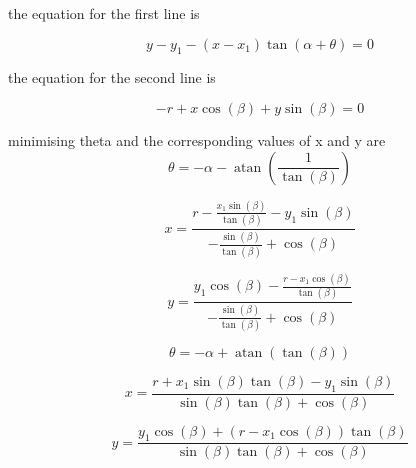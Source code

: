 \documentclass[12pt]{article}
\begin{document}
the equation for the first line is

$$y - y_{1} - \left(x - x_{1}\right) \tan{\left (\alpha + \theta \right )} = 0$$

the equation for the second line is

$$- r + x \cos{\left (\beta \right )} + y \sin{\left (\beta \right )} = 0$$

minimising theta and the corresponding values of x and y are
$$\theta = - \alpha - \operatorname{atan}{\left (\frac{1}{\tan{\left (\beta \right )}} \right )}$$

$$x = \frac{r - \frac{x_{1} \sin{\left (\beta \right )}}{\tan{\left (\beta \right )}} - y_{1} \sin{\left (\beta \right )}}{- \frac{\sin{\left (\beta \right )}}{\tan{\left (\beta \right )}} + \cos{\left (\beta \right )}}$$

$$y = \frac{y_{1} \cos{\left (\beta \right )} - \frac{r - x_{1} \cos{\left (\beta \right )}}{\tan{\left (\beta \right )}}}{- \frac{\sin{\left (\beta \right )}}{\tan{\left (\beta \right )}} + \cos{\left (\beta \right )}}$$

$$\theta = - \alpha + \operatorname{atan}{\left (\tan{\left (\beta \right )} \right )}$$

$$x = \frac{r + x_{1} \sin{\left (\beta \right )} \tan{\left (\beta \right )} - y_{1} \sin{\left (\beta \right )}}{\sin{\left (\beta \right )} \tan{\left (\beta \right )} + \cos{\left (\beta \right )}}$$

$$y = \frac{y_{1} \cos{\left (\beta \right )} + \left(r - x_{1} \cos{\left (\beta \right )}\right) \tan{\left (\beta \right )}}{\sin{\left (\beta \right )} \tan{\left (\beta \right )} + \cos{\left (\beta \right )}}$$
\end{document}
